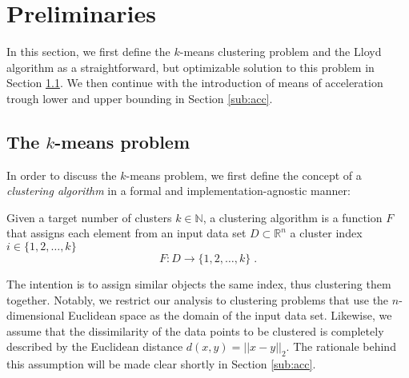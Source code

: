 \newcommand{\kmeans}{$k$-means problem\xspace}

\section{Preliminaries}\label{Preliminaries}

In this section, we first define the $k$-means clustering problem and the Lloyd algorithm as a straightforward, but optimizable solution to this problem in Section \ref{subsec: kmeans}.
We then continue with the introduction of means of acceleration trough lower and upper bounding in Section \ref{sub:acc}.


\subsection{The \kmeans} \label{subsec: kmeans}

In order to discuss the \kmeans, we first define the concept of a \emph{clustering algorithm} in a formal and implementation-agnostic manner:
\begin{definition}
	Given a target number of clusters $k \in \mathbb{N}$, a clustering algorithm is a function $F$ that assigns each element from an input data set $D\subset \mathbb{R}^n$ a
	cluster index $i \in \{1, 2, \ldots, k\}$
	$$ F:D \to \{1, 2, \ldots, k\} \;.$$
\end{definition}
The intention is to assign similar objects the same index, thus clustering them together.
Notably, we restrict our analysis to clustering problems that use the $n$-dimensional Euclidean space as the domain of the input data set.
Likewise, we assume that the dissimilarity of the data points to be clustered is completely described by the Euclidean distance $d(x,y)= || x-y ||_2 $.
The rationale behind this assumption will be made clear shortly in Section \ref{sub:acc}.

